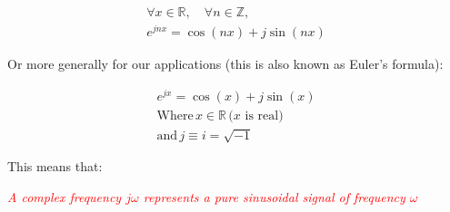 \documentclass[
  12pt,
  a4paper,
]{report}
\newcommand{\redtext}[1]{\textcolor{red}{#1}}
\begin{document}
\begin{gather}
    \label{eq:de-moivre-formula}
    \forall x \in \mathbb{R}, \quad \forall n \in \mathbb{Z}, \\
    e^{jnx} = \cos(n x) + j \sin(n x)  
\end{gather}

\label{de-moivre-formula-general}
Or more generally for our applications (this is also known as Euler's
formula):

\begin{gather}
    \label{eq:de-moivre-formula-general}
    e^{jx} = \cos(x) + j \sin(x) \\
    \text{Where} \, x \in \mathbb{R}\, \text{(\(x\) is real)} \\
    \text{and} \, j \equiv i = \sqrt{-1}
\end{gather}

\label{complex-sinusoid-def-1}
This means that:\\
\begin{mdframed}
    \begin{center}
        \redtext{\emph{A complex frequency \(j\omega \) represents a pure sinusoidal signal of frequency \(\omega \) \unit{\rads}}}
    \end{center}
\end{mdframed}

\newpage{}

\clearpage
\end{document}
